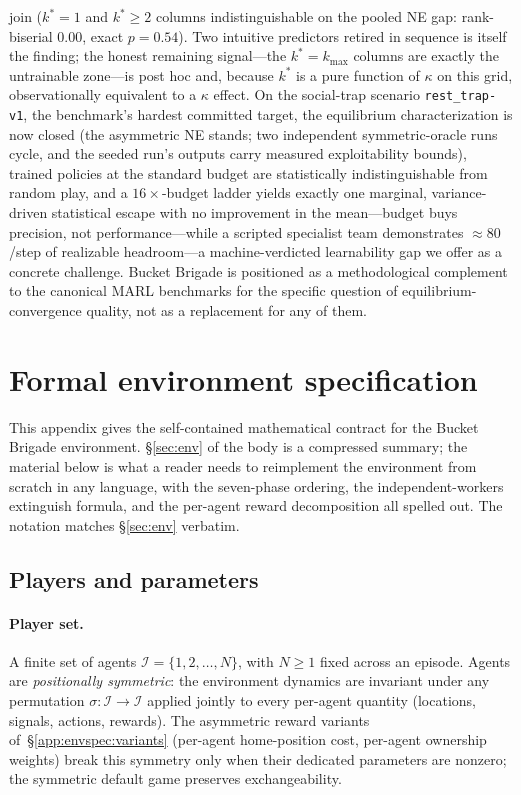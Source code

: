 \documentclass{anvil-paper}
\begin{document}
join ($k^{*}{=}1$ and $k^{*}{\geq}2$ columns indistinguishable on the
pooled NE gap: rank-biserial $0.00$, exact $p{=}0.54$). Two intuitive
predictors retired in sequence is itself the finding; the honest
remaining signal---the $k^{*}{=}k_{\max}$ columns are exactly the
untrainable zone---is post hoc and, because $k^{*}$ is a pure function
of $\kappa$ on this grid, observationally equivalent to a $\kappa$
effect. On the
social-trap scenario \texttt{rest\_trap-v1}, the benchmark's hardest
committed target, the equilibrium characterization is now closed (the
asymmetric NE stands; two independent symmetric-oracle runs cycle, and
the seeded run's outputs carry measured exploitability bounds), trained
policies at the standard budget are statistically
indistinguishable from random play, and a $16{\times}$-budget ladder
yields exactly one marginal, variance-driven statistical escape with no
improvement in the mean---budget buys precision, not
performance---while a scripted specialist team
demonstrates ${\approx}80$/step of realizable headroom---a
machine-verdicted learnability gap we offer as a concrete challenge.
Bucket Brigade is positioned as a methodological
complement to the canonical MARL benchmarks for the specific question of
equilibrium-convergence quality, not as a replacement for any of them.




\appendix

\section{Formal environment specification}
\label{app:envspec}

This appendix gives the self-contained mathematical contract for the Bucket
Brigade environment. \S\ref{sec:env} of the body is a compressed summary;
the material below is what a reader needs to reimplement the environment
from scratch in any language, with the seven-phase ordering, the
independent-workers extinguish formula, and the per-agent reward
decomposition all spelled out. The notation matches \S\ref{sec:env}
verbatim.

\subsection{Players and parameters}
\label{app:envspec:setup}

\paragraph{Player set.} A finite set of agents
$\mathcal{I}=\{1,2,\ldots,N\}$, with $N\geq 1$ fixed across an episode.
Agents are \emph{positionally symmetric}: the environment dynamics are
invariant under any permutation $\sigma:\mathcal{I}\to\mathcal{I}$ applied
jointly to every per-agent quantity (locations, signals, actions,
rewards). The asymmetric reward variants of~\S\ref{app:envspec:variants}
(per-agent home-position cost, per-agent ownership weights) break this
symmetry only when their dedicated parameters are nonzero; the symmetric
default game preserves exchangeability.
\end{document}
